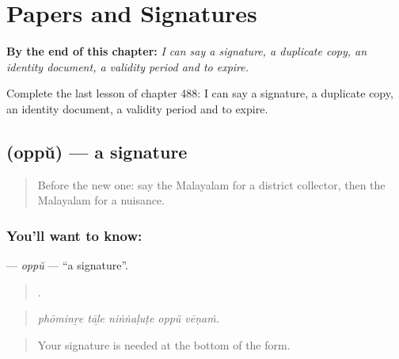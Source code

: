 
\chapter{Papers and Signatures}
\label{ch:ml-papers-and-signatures}

\begin{chapteropening}
\textbf{By the end of this chapter:} \emph{I can say a signature, a duplicate copy, an identity document, a validity period and to expire.}

Complete the last lesson of chapter 488: I can say a signature, a duplicate copy, an identity document, a validity period and to expire.
\end{chapteropening}

\section[\texorpdfstring{\ml{ഒപ്പ്} (oppŭ)}{ഒപ്പ് (oppŭ)}]{ (oppŭ) — a signature}

\label{lesson:ML-C488-oppu}



\begin{quote}
Before the new one: say the Malayalam for a district collector, then the Malayalam for a nuisance.
\end{quote}

\subsection*{You'll want to know: }
\textbf{} — \emph{oppŭ} — \textquotedblleft{}a signature\textquotedblright{}.

\begin{quote}
    .
\end{quote}

\begin{quote}
\emph{phōminṟe tāḻe niṅṅaḷuṭe oppŭ vēṇaṁ.}
\end{quote}

\begin{quote}
Your signature is needed at the bottom of the form.
\end{quote}

